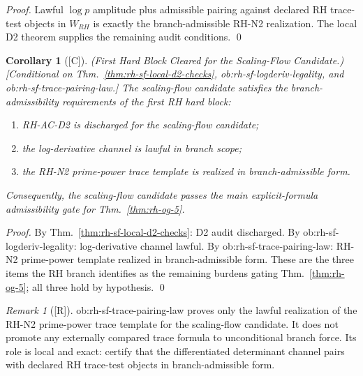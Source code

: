 \documentclass[12pt,oneside]{amsbook}
\theoremstyle{plain}
\newtheorem{corollary}[theorem]{Corollary}
\theoremstyle{definition}
\theoremstyle{remark}
\newtheorem{remark}[theorem]{Remark}
\newcommand{\status}[1]{\textup{[#1]}}
\begin{document}
\begin{proof}
Lawful $\log p$ amplitude plus admissible pairing against declared
RH trace-test objects in $W_{RH}$ is exactly the branch-admissible
RH-N2 realization. The local D2 theorem supplies the remaining
audit conditions. \qed
\end{proof}

\begin{corollary}[\status{C}]\label{cor:rh-sf-first-hard-block-cleared}
\textup{(First Hard Block Cleared for the Scaling-Flow Candidate.)}
\textup{[Conditional on Thm.~\ref{thm:rh-sf-local-d2-checks},
ob:rh-sf-logderiv-legality, and ob:rh-sf-trace-pairing-law.]}
The scaling-flow candidate satisfies the branch-admissibility
requirements of the first RH hard block:
\begin{enumerate}[label=\textup{(\arabic*)}]
 \item RH-AC-D2 is discharged for the scaling-flow candidate;
 \item the log-derivative channel is lawful in branch scope;
 \item the RH-N2 prime-power trace template is realized in
 branch-admissible form.
\end{enumerate}
Consequently, the scaling-flow candidate passes the main
explicit-formula admissibility gate for Thm.~\ref{thm:rh-og-5}.
\end{corollary}

\begin{proof}
By Thm.~\ref{thm:rh-sf-local-d2-checks}: D2 audit discharged.
By ob:rh-sf-logderiv-legality: log-derivative channel lawful.
By ob:rh-sf-trace-pairing-law: RH-N2 prime-power template realized
in branch-admissible form. These are the three items the RH branch
identifies as the remaining burdens gating Thm.~\ref{thm:rh-og-5};
all three hold by hypothesis. \qed
\end{proof}

\begin{remark}[\status{R}]\label{rem:rh-sf-trace-pairing-scope}
ob:rh-sf-trace-pairing-law proves only the lawful realization of
the RH-N2 prime-power trace template for the scaling-flow candidate.
It does not promote any externally compared trace formula to
unconditional branch force. Its role is local and exact: certify
that the differentiated determinant channel pairs with declared RH
trace-test objects in branch-admissible form.
\end{remark}

\end{document}
